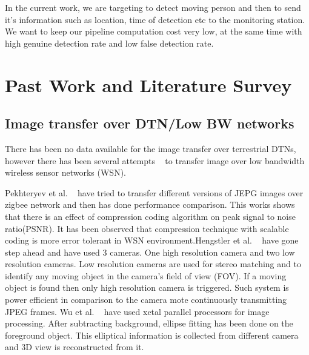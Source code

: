 In the current work, we are targeting to detect moving person and
then to send it's information such as location, time of detection etc to
the monitoring station. We want to keep our pipeline computation cost
very low, at the same time with high genuine detection rate and low
false detection rate.


\section{Past Work and Literature Survey}

\subsection{Image transfer over DTN/Low BW networks}

There has been no data available for the image transfer over terrestrial
DTNs, however there has been several attempts ~\cite{2, 3, 4, 5} to transfer
image over low bandwidth wireless sensor networks (WSN).

Pekhteryev et al. ~\cite{2} have tried to transfer different versions of JEPG
images over zigbee network and then has done performance comparison.
This works shows that there is an effect of compression coding algorithm
on peak signal to noise ratio(PSNR). It has been observed that
compression technique with scalable coding is more error tolerant in WSN
environment.Hengstler et al. ~\cite{3, 5} have gone step ahead and have used 3
cameras. One high resolution camera and two low resolution cameras. Low
resolution cameras are used for stereo matching and to identify any
moving object in the camera's field of view (FOV). If a moving object is
found then only high resolution camera is triggered. Such system is
power efficient in  comparison to the camera mote continuously
transmitting JPEG frames. Wu et al. ~\cite{4} have used xetal parallel
processors for image processing. After subtracting background, ellipse
fitting has been done on the foreground object. This elliptical
information is collected from different camera and 3D view is
reconstructed from it. 


